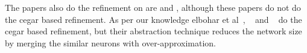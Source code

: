  The papers also do the refinement on \deeppoly{} are \cite{deepsrgr} and \cite{refinepoly}, although these papers
 do not do the cegar based refinement. As per our knowledge elbohar et al~\cite{4class}, 
 ~\cite{4class1} and ~\cite{4class2} do the cegar based refinement, but their abstraction technique reduces the network
 size by merging the similar neurons with over-approximation.   
